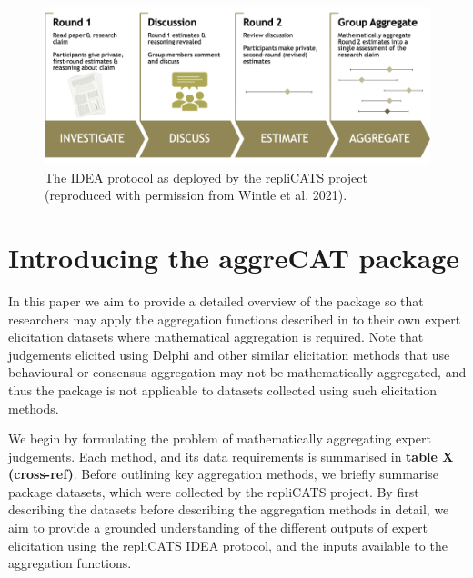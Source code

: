 \documentclass[article]{jss}
\begin{document}
\begin{figure}

{\centering \includegraphics{images/img_IDEA_repliCATS.png}

}

\caption{The IDEA protocol as deployed by the repliCATS project
(reproduced with permission from Wintle et al. 2021).}

\end{figure}

\hypertarget{introducing-the-aggrecat-package}{%
\section{Introducing the aggreCAT
package}\label{introducing-the-aggrecat-package}}

In this paper we aim to provide a detailed overview of the
 package so that researchers may apply the aggregation
functions described in \citep{Hanea2021} to their own expert elicitation
datasets where mathematical aggregation is required. Note that
judgements elicited using Delphi and other similar elicitation methods
that use behavioural or consensus aggregation may not be mathematically
aggregated, and thus the  package is not applicable to
datasets collected using such elicitation methods.

We begin by formulating the problem of mathematically aggregating expert
judgements. Each method, and its data requirements is summarised in
\textbf{table X (cross-ref)}. Before outlining key aggregation methods,
we briefly summarise package datasets, which were collected by the
repliCATS project. By first describing the datasets before describing
the aggregation methods in detail, we aim to provide a grounded
understanding of the different outputs of expert elicitation using the
repliCATS IDEA protocol, and the inputs available to the aggregation
functions.
\end{document}
